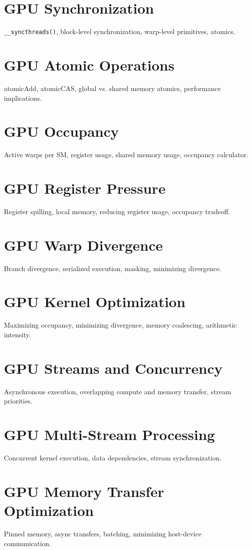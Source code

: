 \chapter{GPU Synchronization}
\texttt{\_\_syncthreads()}, block-level synchronization, warp-level primitives, atomics.

\chapter{GPU Atomic Operations}
atomicAdd, atomicCAS, global vs. shared memory atomics, performance implications.

\chapter{GPU Occupancy}
Active warps per SM, register usage, shared memory usage, occupancy calculator.

\chapter{GPU Register Pressure}
Register spilling, local memory, reducing register usage, occupancy tradeoff.

\chapter{GPU Warp Divergence}
Branch divergence, serialized execution, masking, minimizing divergence.

\chapter{GPU Kernel Optimization}
Maximizing occupancy, minimizing divergence, memory coalescing, arithmetic intensity.

\chapter{GPU Streams and Concurrency}
Asynchronous execution, overlapping compute and memory transfer, stream priorities.

\chapter{GPU Multi-Stream Processing}
Concurrent kernel execution, data dependencies, stream synchronization.

\chapter{GPU Memory Transfer Optimization}
Pinned memory, async transfers, batching, minimizing host-device communication.


